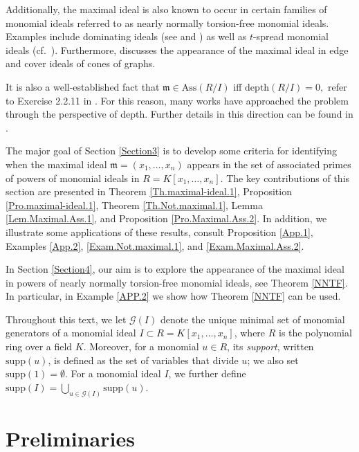 \documentclass[11pt]{amsart}
\begin{document}
Additionally, the maximal ideal is also known to occur in certain families of monomial ideals referred to as nearly normally torsion-free monomial ideals. Examples include dominating ideals (see \cite[Theorem 4.4]{NBR} and \cite[Theorem 3.9]{NQBM}) as well as $t$-spread monomial ideals (cf.\ \cite[Lemma 5.15]{NQKR}). Furthermore, \cite[Lemma 3.5]{NQT} discusses the appearance of the maximal ideal in edge and cover ideals of cones of graphs.  

  It is also a well-established fact that  $\mathfrak{m}\in \mathrm{Ass}(R/I)$ iff $\mathrm{depth}(R/I)=0,$ refer to  Exercise 2.2.11 in \cite{V1}. For this reason, many works have approached the problem through the perspective of depth. Further details in this direction can be found in \cite{BHH, HNTT, HH2, MST, RS}.
 
  The major goal of Section \ref{Section3} is to develop some  criteria for identifying when the maximal ideal  $\mathfrak{m}=(x_1, \ldots, x_n)$ appears in the set of associated primes of powers of monomial ideals in  $R = K[x_1, \ldots, x_n].$  
The key contributions of this section  are presented in Theorem  \ref{Th.maximal-ideal.1}, Proposition  \ref{Pro.maximal-ideal.1}, Theorem \ref{Th.Not.maximal.1}, 
Lemma \ref{Lem.Maximal.Ass.1}, and Proposition \ref{Pro.Maximal.Ass.2}. In addition, we illustrate some  applications of these results, consult  Proposition \ref{App.1}, Examples \ref{App.2},  \ref{Exam.Not.maximal.1}, and  \ref{Exam.Maximal.Ass.2}.

 In Section \ref{Section4}, our aim is to explore the appearance of the maximal ideal in powers of nearly normally torsion-free monomial ideals, see Theorem \ref{NNTF}. In particular, in Example \ref{APP.2} we show how Theorem \ref{NNTF}  can be used.

Throughout this text, we let $\mathcal{G}(I)$ denote the unique minimal set of monomial generators of a monomial ideal $I \subset R = K[x_1, \ldots, x_n]$, where $R$ is the polynomial ring over a field $K$. Moreover, for a monomial $u \in R$, its {\em support}, written $\mathrm{supp}(u)$, is defined as the set of variables that divide $u$;  we also set $\mathrm{supp}(1) = \emptyset$. For a monomial ideal $I$, we further define  
$\mathrm{supp}(I) = \bigcup_{u \in \mathcal{G}(I)} \mathrm{supp}(u).$



\section{Preliminaries}
\end{document}
